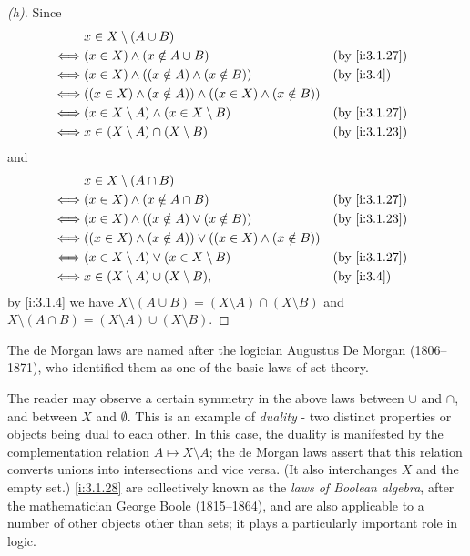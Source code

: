 \begin{proof}[(h)]
  Since
  \begin{align*}
         & x \in X \setminus (A \cup B)                                                           \\
    \iff & (x \in X) \land (x \notin A \cup B)                                 &  & \by{i:3.1.27} \\
    \iff & (x \in X) \land ((x \notin A) \land (x \notin B))                   &  & \by{i:3.4}    \\
    \iff & ((x \in X) \land (x \notin A)) \land ((x \in X) \land (x \notin B))                    \\
    \iff & (x \in X \setminus A) \land (x \in X \setminus B)                   &  & \by{i:3.1.27} \\
    \iff & x \in (X \setminus A) \cap (X \setminus B)                          &  & \by{i:3.1.23}
  \end{align*}
  and
  \begin{align*}
         & x \in X \setminus (A \cap B)                                                          \\
    \iff & (x \in X) \land (x \notin A \cap B)                                &  & \by{i:3.1.27} \\
    \iff & (x \in X) \land ((x \notin A) \lor (x \notin B))                   &  & \by{i:3.1.23} \\
    \iff & ((x \in X) \land (x \notin A)) \lor ((x \in X) \land (x \notin B))                    \\
    \iff & (x \in X \setminus A) \lor (x \in X \setminus B)                   &  & \by{i:3.1.27} \\
    \iff & x \in (X \setminus A) \cup (X \setminus B),                        &  & \by{i:3.4}
  \end{align*}
  by \cref{i:3.1.4} we have \(X \setminus (A \cup B) = (X \setminus A) \cap (X \setminus B)\) and \(X \setminus (A \cap B) = (X \setminus A) \cup (X \setminus B)\).
\end{proof}

\begin{rmk}\label{i:3.1.29}
  The de Morgan laws are named after the logician Augustus De Morgan (1806--1871), who identified them as one of the basic laws of set theory.
\end{rmk}

\begin{rmk}\label{i:3.1.30}
  The reader may observe a certain symmetry in the above laws between \(\cup\) and \(\cap\), and between \(X\) and \(\emptyset\).
  This is an example of \emph{duality} - two distinct properties or objects being dual to each other.
  In this case, the duality is manifested by the complementation relation \(A \mapsto X \setminus A\);
  the de Morgan laws assert that this relation converts unions into intersections and vice versa.
  (It also interchanges \(X\) and the empty set.)
  \cref{i:3.1.28} are collectively known as the \emph{laws of Boolean algebra}, after the mathematician George Boole (1815--1864), and are also applicable to a number of other objects other than sets;
  it plays a particularly important role in logic.
\end{rmk}

